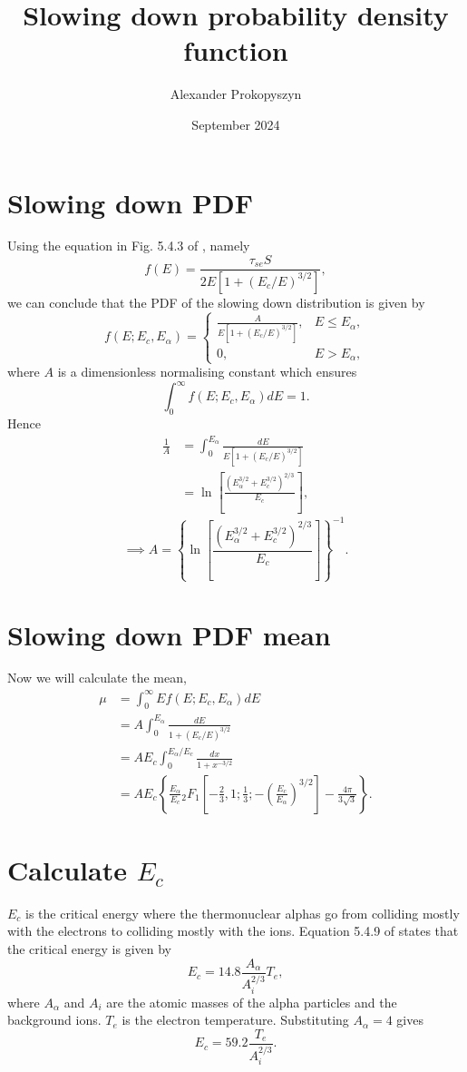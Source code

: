 \documentclass{article}
\title{Slowing down probability density function}
\author{Alexander Prokopyszyn}
\date{September 2024}
\begin{document}
\maketitle

\section{Slowing down PDF}

Using the equation in Fig. 5.4.3 of \citep{wesson2004tokamaks}, namely
\[
f(E) = \frac{\tau_{se} S}{2E[1+(E_c/E)^{3/2}]},
\]
we can conclude that the PDF of the slowing down distribution is given by
\[
f(E; E_c, E_\alpha)=
\begin{cases}
   \frac{A}{E[1+(E_c/E)^{3/2}]},& E\le E_\alpha, \\
   0,& E > E_\alpha,
\end{cases}
\]
where $A$ is a dimensionless normalising constant which ensures
\[
\int_0^\infty f(E; E_c, E_\alpha)dE = 1.
\]
Hence
\[
\begin{aligned}
\frac{1}{A} &= \int_0^{E_\alpha}\frac{dE}{E[1+(E_c/E)^{3/2}]} \\
&=\ln\left[\frac{(E_\alpha^{3/2}+E_c^{3/2})^{2/3}}{E_c}\right],
\end{aligned}
\]
\[
\implies A = \left\{\ln\left[\frac{(E_\alpha^{3/2}+E_c^{3/2})^{2/3}}{E_c}\right]\right\}^{-1}.
\]

\section{Slowing down PDF mean}

Now we will calculate the mean,
\[
\begin{aligned}
\mu  &= \int_0^\infty E f(E; E_c, E_\alpha) dE \\
&=A\int_0^{E_\alpha}\frac{dE}{1+(E_c/E)^{3/2}} \\
&= AE_c\int_0^{E_\alpha/E_c}\frac{dx}{1+x^{-3/2}} \\
&= AE_c\left\{\frac{E_\alpha}{E_c} {}_2F_1\left[-\frac{2}{3}, 1; \frac{1}{3}; -\left(\frac{E_c}{E_\alpha}\right)^{3/2}\right] - \frac{4\pi}{3\sqrt{3}}\right\}.
\end{aligned}
\]

\section{Calculate $E_c$}

$E_c$ is the critical energy where the thermonuclear alphas go from colliding
mostly with the electrons to colliding mostly with the ions. Equation 5.4.9
of \citep{wesson2004tokamaks} states that the critical energy is given by
\[
E_c = 14.8\frac{A_\alpha}{A_i^{2/3}}T_e,
\]
where $A_\alpha$ and $A_i$ are the atomic masses of the alpha particles and the
 background ions. $T_e$ is the electron temperature. Substituting $A_\alpha = 4$ gives
\[
E_c = 59.2 \frac{T_e}{A_i^{2/3}}.
\]
\end{document}
